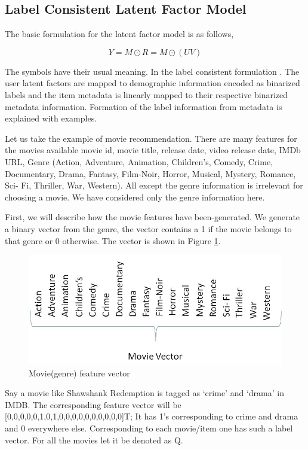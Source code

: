 \documentclass[conference]{IEEEtran}
\begin{document}
  \subsection{Label Consistent Latent Factor Model}
   The basic formulation for the latent factor model is as follows, 

  \begin{equation}
    Y = M \odot R = M \odot (UV)
  \end{equation}

The symbols have their usual meaning. In the label consistent formulation \cite{gogna2016supervised}. The user latent factors are mapped to demographic information encoded as binarized labels and the item metadata is linearly mapped to their respective binarized metadata information. Formation of the label information from metadata is explained with examples.

Let us take the example of movie recommendation. There are many features for the movies available movie id, movie title, release date, video release date, IMDb URL, Genre (Action, Adventure, Animation, Children’s, Comedy, Crime, Documentary, Drama, Fantasy, Film-Noir, Horror, Musical, Mystery, Romance, Sci- Fi, Thriller, War, Western). All except the genre information is irrelevant for choosing a movie. We have considered only the genre information here.

First, we will describe how the movie features have been-generated. We generate a binary vector from the genre, the vector contains a 1 if the movie belongs to that genre or 0 otherwise. The vector is shown in Figure \ref{fig:genre_vector}.

  \begin{figure}
    \centering
      \includegraphics[width=0.6\linewidth]{genre_vector.png}
        \caption{Movie(genre) feature vector}
        \label{fig:genre_vector}
  \end{figure}

Say a movie like Shawshank Redemption is tagged as ‘crime’ and ‘drama’ in IMDB. The corresponding feature vector will be [0,0,0,0,0,1,0,1,0,0,0,0,0,0,0,0,0,0]T; It has 1’s corresponding to crime and drama and 0 everywhere else. Corresponding to each movie/item one has such a label vector. For all the movies let it be denoted as Q. 
\end{document}
